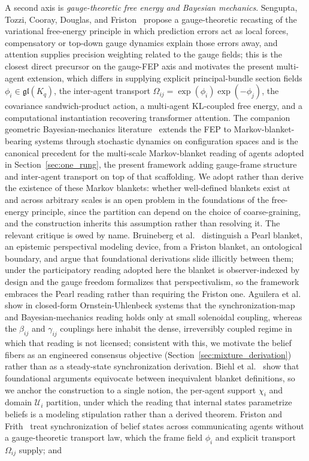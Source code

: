 \documentclass[11pt]{article}
\begin{document}
A second axis is \emph{gauge-theoretic free energy and Bayesian mechanics}. Sengupta, Tozzi, Cooray, Douglas, and Friston~\cite{Sengupta2016NeuronalGauge} propose a gauge-theoretic recasting of the variational free-energy principle in which prediction errors act as local forces, compensatory or top-down gauge dynamics explain those errors away, and attention supplies precision weighting related to the gauge fields; this is the closest direct precursor on the gauge-FEP axis and motivates the present multi-agent extension, which differs in supplying explicit principal-bundle section fields $\phi_i \in \mathfrak{gl}(K_q)$, the inter-agent transport $\Omega_{ij} = \exp(\phi_i)\exp(-\phi_j)$, the covariance sandwich-product action, a multi-agent KL-coupled free energy, and a computational instantiation recovering transformer attention. The companion geometric Bayesian-mechanics literature~\cite{friston2019particular, dacosta2021bayesian, ramstead2023bayesian, Sakthivadivel2022, KirchhoffParrPalaciosFristonKiverstein2018} extends the FEP to Markov-blanket-bearing systems through stochastic dynamics on configuration spaces and is the canonical precedent for the multi-scale Markov-blanket reading of agents adopted in Section~\ref{sec:one_rung}, the present framework adding gauge-frame structure and inter-agent transport on top of that scaffolding. We adopt rather than derive the existence of these Markov blankets: whether well-defined blankets exist at and across arbitrary scales is an open problem in the foundations of the free-energy principle, since the partition can depend on the choice of coarse-graining, and the construction inherits this assumption rather than resolving it. The relevant critique is owed by name. Bruineberg et al.~\cite{bruineberg2022emperor} distinguish a Pearl blanket, an epistemic perspectival modeling device, from a Friston blanket, an ontological boundary, and argue that foundational derivations slide illicitly between them; under the participatory reading adopted here the blanket is observer-indexed by design and the gauge freedom formalizes that perspectivalism, so the framework embraces the Pearl reading rather than requiring the Friston one. Aguilera et al.~\cite{aguilera2022particular} show in closed-form Ornstein-Uhlenbeck systems that the synchronization-map and Bayesian-mechanics reading holds only at small solenoidal coupling, whereas the $\beta_{ij}$ and $\gamma_{ij}$ couplings here inhabit the dense, irreversibly coupled regime in which that reading is not licensed; consistent with this, we motivate the belief fibers as an engineered consensus objective (Section~\ref{sec:mixture_derivation}) rather than as a steady-state synchronization derivation. Biehl et al.~\cite{biehl2021technical} show that foundational arguments equivocate between inequivalent blanket definitions, so we anchor the construction to a single notion, the per-agent support $\chi_i$ and domain $\mathcal{U}_i$ partition, under which the reading that internal states parametrize beliefs is a modeling stipulation rather than a derived theorem. Friston and Frith~\cite{FristonFrith2015duet} treat synchronization of belief states across communicating agents without a gauge-theoretic transport law, which the frame field $\phi_i$ and explicit transport $\Omega_{ij}$ supply; and 
\end{document}
